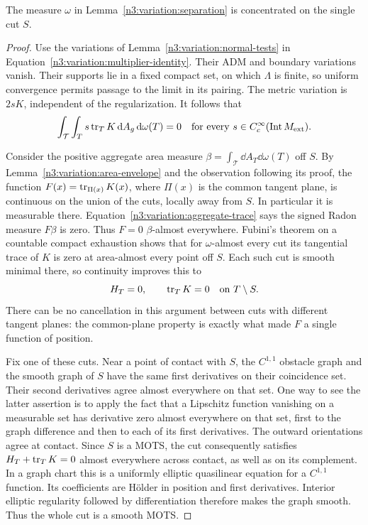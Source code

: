 \begin{lemma}
\label{n3:variation:area-support}
The measure $\omega$ in Lemma~\ref{n3:variation:separation} is
concentrated on the single cut $S$.
\end{lemma}

\begin{proof}
Use the variations of Lemma~\ref{n3:variation:normal-tests} in
Equation~\eqref{n3:variation:multiplier-identity}.  Their ADM and
boundary variations vanish.  Their supports lie in a fixed compact
set, on which $\Lambda$ is finite, so uniform convergence permits
passage to the limit in its pairing.  The metric variation is $2sK$,
independent of the regularization.  It follows that
\begin{equation}
 \int_{\mathcal T}\int_T s\operatorname{tr}_TK\,\mathrm d A_g\,\mathrm d\omega(T)=0
 \quad\hbox{for every }s\in C_c^\infty(\operatorname{Int}M_{\mathrm{ext}}).
 \label{n3:variation:aggregate-trace}
\end{equation}

Consider the positive aggregate area measure
$\beta=\int_{\mathcal T}\dd A_T\dd\omega(T)$ off $S$.
By Lemma~\ref{n3:variation:area-envelope} and the observation following
its proof, the function $F(x)=\operatorname{tr}_{\Pi(x)}K(x)$, where $\Pi(x)$ is
the common tangent plane, is continuous on the union of the cuts,
locally away from $S$.  In particular it is measurable there.
Equation~\eqref{n3:variation:aggregate-trace} says the signed Radon
measure $F\beta$ is zero.  Thus $F=0$ $\beta$-almost everywhere.
Fubini's theorem on a countable compact exhaustion shows that for
$\omega$-almost every cut its tangential trace of $K$ is zero at
area-almost every point off $S$.  Each such cut is smooth minimal
there, so continuity improves this to
\[
 H_T=0,\qquad \operatorname{tr}_TK=0\quad\hbox{on }T\setminus S.
\]
There can be no cancellation in this argument between cuts with
different tangent planes: the common-plane property is exactly what
made $F$ a single function of position.

Fix one of these cuts.  Near a point of contact with $S$, the
$C^{1,1}$ obstacle graph and the smooth graph of $S$ have the same
first derivatives on their coincidence set.  Their second
derivatives agree almost everywhere on that set.  One way to see
the latter assertion is to apply the fact that a Lipschitz function
vanishing on a measurable set has derivative zero almost everywhere
on that set, first to the graph difference and then to each of its
first derivatives.  The outward orientations agree at contact.
Since $S$ is a MOTS, the cut consequently satisfies
$H_T+\operatorname{tr}_TK=0$ almost everywhere across contact, as well as on its
complement.  In a graph chart this is a uniformly elliptic
quasilinear equation for a $C^{1,1}$ function.  Its coefficients are
Hölder in position and first derivatives.  Interior elliptic
regularity followed by differentiation therefore makes the graph
smooth.  Thus the whole cut is a smooth MOTS.


\end{proof}
